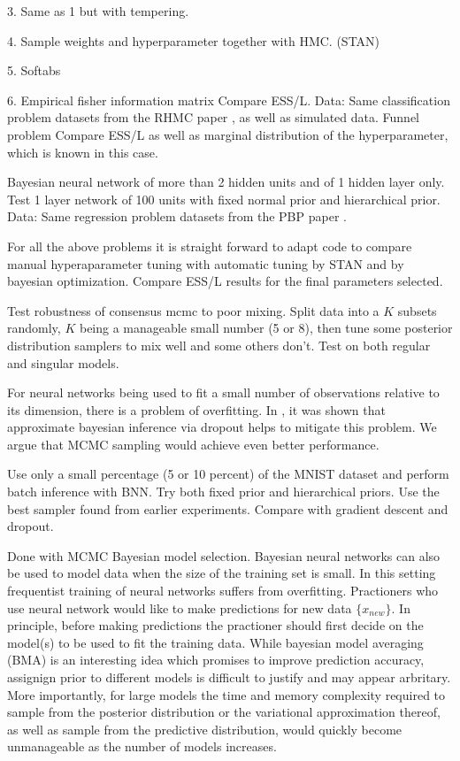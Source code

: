 \documentclass[]{report}
\begin{document}
\begin{enumerate}
3. Same as 1 but with tempering. 

4. Sample weights and hyperparameter together with HMC. (STAN)

5. Softabs 

6. Empirical fisher information matrix 
Compare ESS/L.
Data: Same classification problem datasets from the RHMC paper \cite{girolami2011riemann}, as well as simulated data.
Funnel problem
Compare ESS/L as well as marginal distribution of the hyperparameter, which is known in this case. 

Bayesian neural network of more than 2 hidden units and of 1 hidden layer only. Test 1 layer network of 100 units with fixed normal prior and hierarchical prior.
Data: Same regression problem datasets from the PBP paper \cite{hernandez2015probabilistic}. 


For all the above problems it is straight forward to adapt code to compare manual hyperaparameter tuning with automatic tuning by STAN and by bayesian optimization. Compare ESS/L results for the final parameters selected. 

Test robustness of consensus mcmc to poor mixing. Split data into a $K$ subsets randomly, $K$ being a manageable small number (5 or 8), then tune some posterior distribution samplers to mix well and some others don't. Test on both regular and singular models.
 
For neural networks being used to fit a small number of observations relative to its dimension, there is a problem of overfitting. In \cite{gal2015bayesian}, it was shown that approximate bayesian inference via dropout helps to mitigate this problem. We argue that MCMC sampling would achieve even better performance.

Use only a small percentage (5 or 10 percent) of the MNIST dataset and perform batch inference with BNN. Try both fixed prior and hierarchical priors. Use the best sampler found from earlier experiments. 
Compare with gradient descent and dropout. 

Done with MCMC
Bayesian model selection. 
Bayesian neural networks can also be used to model data when the size of the training set is small. In this setting frequentist training of neural networks suffers from overfitting. Practioners who use neural network would like to make predictions for new data $\{x_{new}\}$. In principle, before making predictions the practioner should first decide on the model(s) to be used to fit the training data. While bayesian model averaging (BMA) is an interesting idea which promises to improve prediction accuracy, assignign prior to different models is difficult to justify and may appear arbritary. More importantly, for large models the time and memory complexity required to sample from the posterior distribution or the variational approximation thereof, as well as sample from the predictive distribution, would quickly become unmanageable as the number of models increases. 


\end{enumerate}
\end{document}
